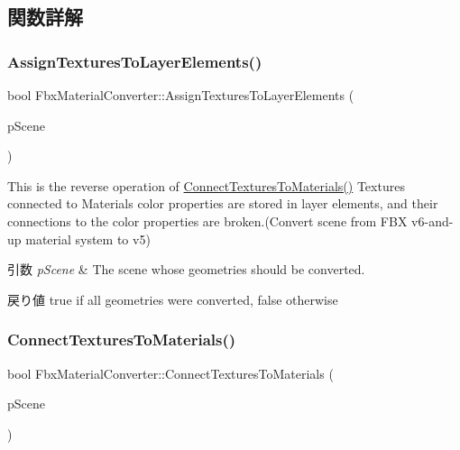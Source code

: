 \subsection{関数詳解}
\mbox{\label{class_fbx_material_converter_aa25fab49c96d5383012f959ef609c1d5}} 
\subsubsection{\texorpdfstring{Assign\+Textures\+To\+Layer\+Elements()}{AssignTexturesToLayerElements()}}
{\footnotesize\ttfamily bool Fbx\+Material\+Converter\+::\+Assign\+Textures\+To\+Layer\+Elements (\begin{DoxyParamCaption}\item[{\hyperlink{class_fbx_scene}{Fbx\+Scene} \&}]{p\+Scene }\end{DoxyParamCaption})}

This is the reverse operation of \hyperlink{class_fbx_material_converter_a46530019d28101c557c8861ed22f2930}{Connect\+Textures\+To\+Materials()} Textures connected to Materials\textquotesingle{} color properties are stored in layer elements, and their connections to the color properties are broken.(Convert scene from F\+BX v6-\/and-\/up material system to v5) 
\begin{DoxyParams}{引数}
{\em p\+Scene} & The scene whose geometries should be converted. \\
\hline
\end{DoxyParams}
\begin{DoxyReturn}{戻り値}
true if all geometries were converted, false otherwise 
\end{DoxyReturn}
\mbox{\label{class_fbx_material_converter_a46530019d28101c557c8861ed22f2930}} 
\subsubsection{\texorpdfstring{Connect\+Textures\+To\+Materials()}{ConnectTexturesToMaterials()}\hspace{0.1cm}{\footnotesize\ttfamily [1/2]}}
{\footnotesize\ttfamily bool Fbx\+Material\+Converter\+::\+Connect\+Textures\+To\+Materials (\begin{DoxyParamCaption}\item[{\hyperlink{class_fbx_scene}{Fbx\+Scene} \&}]{p\+Scene }\end{DoxyParamCaption})}

